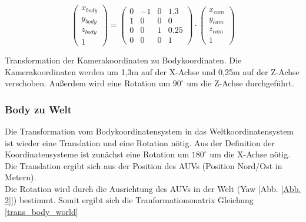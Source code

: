 \begin{ownequation}[H]
\begin{equation}
\begin{pmatrix}
x_{body}\\y_{body}\\z_{body}\\1
\end{pmatrix}
=
\begin{pmatrix}
0 & -1 & 0& 1.3\\
1 & 0 & 0& 0\\
0 & 0 & 1& 0.25\\
0 & 0 & 0 & 1
\end{pmatrix}
\cdot
\begin{pmatrix}
x_{cam}\\y_{cam}\\z_{cam}\\1
\end{pmatrix}
\end{equation}
\caption[Transformation der Kamerakoordinaten zu Bodykoordinaten]{Transformation der Kamerakoordinaten zu Bodykoordinaten. Die Kamerakoordinaten werden um 1,3m auf der X-Achse und 0,25m auf der Z-Achse verschoben. Außerdem wird eine Rotation um $90^\circ$ um die Z-Achse durchgeführt.}
\label{trans_cam_body}
\end{ownequation}

\subsubsection{Body zu Welt}
Die Transformation vom Bodykoordinatensystem in das Weltkoordinatensystem ist wieder eine Translation und eine Rotation nötig.
Aus der Definition der Koordinatensysteme ist zunächst eine Rotation um $180^\circ$ um die X-Achse nötig.
Die Translation ergibt sich aus der Position des AUVs (Position Nord/Ost in Metern).\\
Die Rotation wird durch die Ausrichtung des AUVs in der Welt (Yaw [Abb. \ref{Abb. 2}]) bestimmt. Somit ergibt sich die Tranformationsmatrix Gleichung \ref{trans_body_world}\\


